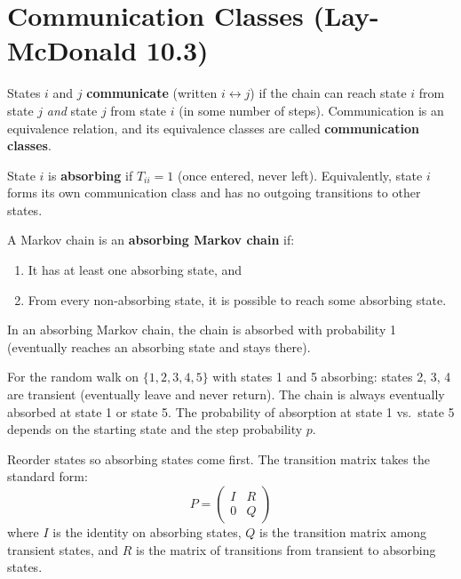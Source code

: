 \section{Communication Classes (Lay-McDonald 10.3)}

\begin{definition}
States $i$ and $j$ \textbf{communicate} (written $i\leftrightarrow j$) if the chain can reach state $i$ from state $j$ \textit{and} state $j$ from state $i$ (in some number of steps). Communication is an equivalence relation, and its equivalence classes are called \textbf{communication classes}.
\end{definition}

\begin{definition}
State $i$ is \textbf{absorbing} if $T_{ii}=1$ (once entered, never left). Equivalently, state $i$ forms its own communication class and has no outgoing transitions to other states.
\end{definition}

\begin{definition}
A Markov chain is an \textbf{absorbing Markov chain} if:
\begin{enumerate}
  \item It has at least one absorbing state, and
  \item From every non-absorbing state, it is possible to reach some absorbing state.
\end{enumerate}
\end{definition}

\begin{theorem}
In an absorbing Markov chain, the chain is absorbed with probability 1 (eventually reaches an absorbing state and stays there).
\end{theorem}

\begin{example}
For the random walk on $\{1,2,3,4,5\}$ with states 1 and 5 absorbing: states 2, 3, 4 are transient (eventually leave and never return). The chain is always eventually absorbed at state 1 or state 5. The probability of absorption at state 1 vs.\ state 5 depends on the starting state and the step probability $p$.
\end{example}

\begin{remark}
Reorder states so absorbing states come first. The transition matrix takes the standard form:
\[
P = \begin{pmatrix}I & R \\ 0 & Q\end{pmatrix}
\]
where $I$ is the identity on absorbing states, $Q$ is the transition matrix among transient states, and $R$ is the matrix of transitions from transient to absorbing states.
\end{remark}

